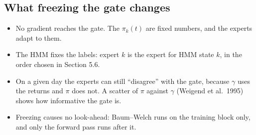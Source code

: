 \subsection{What freezing the gate changes}
\begin{itemize}
  \item No gradient reaches the gate. The $\pi_k(t)$ are fixed numbers, and the experts adapt to them.
  \item The HMM fixes the labels: expert $k$ is the expert for HMM state $k$, in the order chosen in Section 5.6.
  \item On a given day the experts can still ``disagree'' with the gate, because $\gamma$ uses the returns and $\pi$ does not. A scatter of $\pi$ against $\gamma$ (Weigend et al.\ 1995) shows how informative the gate is.
  \item Freezing causes no look-ahead: Baum--Welch runs on the training block only, and only the forward pass runs after it.
\end{itemize}
\newpage
